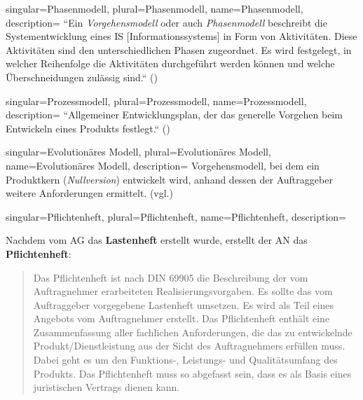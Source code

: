 {
singular={Phasenmodell},
plural={Phasenmodell},
name={Phasenmodell},
description={
``Ein \textit{Vorgehensmodell} oder auch \textit{Phasenmodell} beschreibt die Systementwicklung
eines IS [Informationssystems] in Form von Aktivitäten. Diese Aktivitäten sind den unterschiedlichen
Phasen zugeordnet. Es wird festgelegt, in welcher Reihenfolge die Aktivitäten
durchgeführt werden können und welche Überschneidungen zulässig sind.`` (\cite[316]{AABG14n})
}
}

{
singular={Prozessmodell},
plural={Prozessmodell},
name={Prozessmodell},
description={
``Allgemeiner Entwicklungsplan, der das generelle Vorgehen beim Entwickeln eines Produkts festlegt.`` (\cite[694]{Bal08})
}
}

{
singular={Evolutionäres Modell},
plural={Evolutionäres Modell},
name={Evolutionäres Modell},
description={
Vorgehensmodell, bei dem ein Produktkern (\textit{Nullversion}) entwickelt wird, anhand dessen der Auftraggeber weitere Anforderungen ermittelt. (vgl.\cite[529 f.]{Bal08})
}
}

{
singular={Pflichtenheft},
plural={Pflichtenheft},
name={Pflichtenheft},
description={
Nachdem vom AG das \textbf{Lastenheft} erstellt wurde, erstellt der AN das \textbf{Pflichtenheft}:
\blockquote[{\cite[306]{AABG14m}}]{
Das Pflichtenheft ist nach DIN 69905 die Beschreibung der vom Auftragnehmer erarbeiteten Realisierungsvorgaben. Es sollte das vom Auftraggeber vorgegebene
Lastenheft umsetzen. Es wird als Teil eines Angebots vom Auftragnehmer erstellt.
Das Pflichtenheft enthält eine Zusammenfassung aller fachlichen Anforderungen,
die das zu entwickelnde Produkt/Dienstleistung aus der Sicht des Auftragnehmers
erfüllen muss. Dabei geht es um den Funktions-, Leistungs- und Qualitätsumfang
des Produkts. Das Pflichtenheft muss so abgefasst sein, dass es als Basis eines juristischen Vertrags dienen kann.
}
}
}

